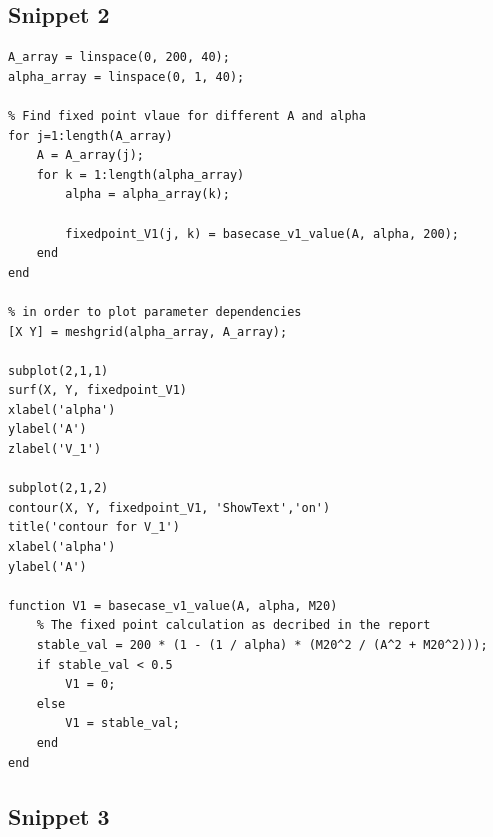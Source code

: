 \documentclass[12pt]{article}
\begin{document}
\subsection{Snippet 2}
\begin{verbatim}
A_array = linspace(0, 200, 40);
alpha_array = linspace(0, 1, 40);

% Find fixed point vlaue for different A and alpha
for j=1:length(A_array)
    A = A_array(j);
    for k = 1:length(alpha_array)
        alpha = alpha_array(k);
        
        fixedpoint_V1(j, k) = basecase_v1_value(A, alpha, 200);
    end 
end

% in order to plot parameter dependencies
[X Y] = meshgrid(alpha_array, A_array);

subplot(2,1,1)
surf(X, Y, fixedpoint_V1)
xlabel('alpha')
ylabel('A')
zlabel('V_1')

subplot(2,1,2)
contour(X, Y, fixedpoint_V1, 'ShowText','on')
title('contour for V_1')
xlabel('alpha')
ylabel('A')

function V1 = basecase_v1_value(A, alpha, M20)
    % The fixed point calculation as decribed in the report
    stable_val = 200 * (1 - (1 / alpha) * (M20^2 / (A^2 + M20^2)));
    if stable_val < 0.5
        V1 = 0;
    else
        V1 = stable_val;
    end
end
\end{verbatim}

\subsection{Snippet 3}
\end{document}
